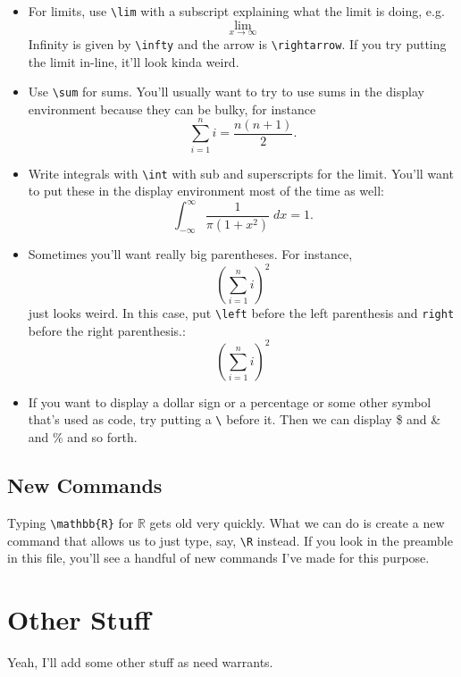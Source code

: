 \documentclass[12pt]{article}
\newcommand{\R}{\mathbb{R}}
\begin{document}
\begin{itemize}
		\item For limits, use \verb|\lim| with a subscript explaining what the limit is doing, e.g.
				\[ \lim_{x \rightarrow \infty}  \]
			Infinity is given by \verb|\infty| and  the arrow is \verb|\rightarrow|. If you try putting the limit in-line, it'll look kinda weird. 
		\item Use \verb|\sum| for sums. You'll usually want to try to use sums in the display environment because they can be bulky, for instance
			\[\sum_{i=1}^n i = \frac{n(n+1)}{2}.\]
			
		\item Write integrals with \verb|\int| with sub and superscripts for the limit. You'll want to put these in the display environment most of the time as well:
			\[ \int_{-\infty}^{\infty} \frac{1}{\pi(1+x^2)} \; dx = 1 .\]
			
		\item Sometimes you'll want really big parentheses. For instance,
				\[ ( \sum_{i=1}^n i)^2	\]
			just looks weird. In this case, put \verb|\left| before the left parenthesis and \verb|right| before the right parenthesis.:
				\[ \left( \sum_{i=1}^n i \right)^2	\]
				
		\item If you want to display a dollar sign or a percentage or some other symbol that's used as code, try putting a \verb|\| before it. Then we can display \$ and \& and \% and so forth.
	\end{itemize}

	
\subsection{New Commands}
	
	Typing \verb|\mathbb{R}| for $\mathbb{R}$ gets old very quickly. What we can do is create a new command that allows us to just type, say, \verb|\R| instead. If you look in the preamble in this file, you'll see a handful of new commands I've made for this purpose. 
	
	
	
	\section{Other Stuff}
	
	Yeah, I'll add some other stuff as need warrants. 
 
	
\end{document}
